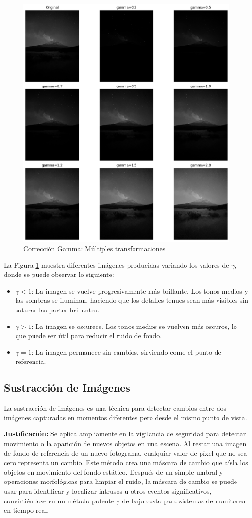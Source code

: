 \documentclass[12pt,letterpaper]{article}
\begin{document}
\begin{figure}[H]
  \centering
  \includegraphics[width=0.5\linewidth]{figuras/correccion_gamma.png}
  \caption{Corrección Gamma: Múltiples transformaciones}
  \label{fig:correccion_gamma}
\end{figure}

La Figura \ref{fig:correccion_gamma} muestra diferentes imágenes producidas variando los valores de $\gamma$, donde se puede observar lo siguiente:

\begin{itemize}
  \item \textbf{$\gamma < 1$}: La imagen se vuelve progresivamente más brillante. Los tonos medios y las sombras se iluminan, haciendo que los detalles tenues sean más visibles sin saturar las partes brillantes.
  \item \textbf{$\gamma > 1$}: La imagen se oscurece. Los tonos medios se vuelven más oscuros, lo que puede ser útil para reducir el ruido de fondo.
  \item \textbf{$\gamma = 1$}: La imagen permanece sin cambios, sirviendo como el punto de referencia.
\end{itemize}

\subsection{Sustracción de Imágenes}

La sustracción de imágenes es una técnica para detectar cambios entre dos imágenes capturadas en momentos diferentes pero desde el mismo punto de vista. 

\textbf{Justificación:} Se aplica ampliamente en la vigilancia de seguridad para detectar movimiento o la aparición de nuevos objetos en una escena.
Al restar una imagen de fondo de referencia de un nuevo fotograma, cualquier valor de píxel que no sea cero representa un cambio. Este método crea una máscara  de cambio que aísla los objetos en movimiento del fondo estático. Después de un simple umbral y operaciones morfológicas para limpiar el ruido, la máscara de cambio se puede usar para identificar y localizar intrusos u otros eventos significativos, convirtiéndose en un método potente y de bajo costo para sistemas de monitoreo en tiempo real.
\end{document}
